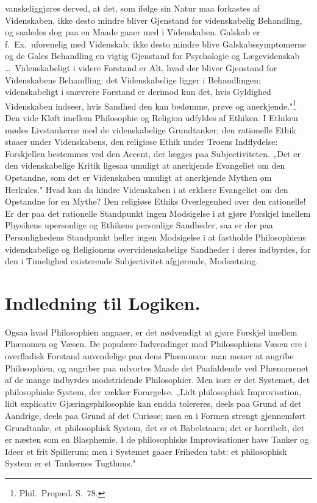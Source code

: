 \documentclass[12pt]{book}
\begin{document}
vanskeliggjøres derved, at det, som ifølge sin Natur maa forkastes af Videnskaben,
ikke desto mindre bliver Gjenstand for videnskabelig Behandling, og saaledes dog
paa en Maade gaaer med i Videnskaben. Galskab er f.\ Ex.\ uforenelig med Videnskab;
ikke desto mindre blive Galskabssymptomerne og de Gales Behandling en vigtig
Gjenstand for Psychologie og Lægevidenskab \dots\ Videnskabeligt i videre Forstand
er Alt, hvad der bliver Gjenstand for Videnskabens Behandling: det Videnskabelige
ligger i Behandlingen; videnskabeligt i snævrere Forstand er derimod kun det, hvis
Gyldighed Videnskaben indseer, hvis Sandhed den kan bedømme, prøve og
anerkjende."\footnote{Phil.\ Propæd. S.~78.}
Den vide Kløft imellem Philosophie og Religion udfyldes af Ethiken. I Ethiken
mødes Livstankerne med de videnskabelige Grundtanker; den rationelle Ethik staaer
under Videnskabens, den religiøse Ethik under Troens Indflydelse: Forskjellen
bestemmes ved den Accent, der lægges paa Subjectiviteten. „Det er den
videnskabelige Kritik ligesaa umuligt at anerkjende Evangeliet om den Opstandne,
som det er Videnskaben umuligt at anerkjende Mythen om Herkules." Hvad kan da
hindre Videnskaben i at erklære Evangeliet om den Opstandne for en Mythe? Den
religiøse Ethiks Overlegenhed over den rationelle! Er der paa det rationelle
Standpunkt ingen Modsigelse i at gjøre Forskjel imellem Physikens upersonlige og
Ethikens personlige Sandheder, saa er der paa Personlighedens Standpunkt heller
ingen Modsigelse i at fastholde Philosophiens videnskabelige og Religionens
overvidenskabelige Sandheder i deres indbyrdes, for den i Timelighed existerende
Subjectivitet afgjørende, Modsætning.

\section*{Indledning til Logiken.}

Ogsaa hvad Philosophien angaaer, er det nødvendigt at gjøre Forskjel imellem
Phænomen og Væsen. De populære Indvendinger mod Philosophiens Væsen ere i
overfladisk Forstand anvendelige paa dens Phænomen: man mener at angribe
Philosophien, og angriber paa udvortes Maade det Paafaldende ved Phænomenet af de
mange indbyrdes modstridende Philosophier. Men især er det Systemet, det
philosophiske System, der vækker Forargelse. „Lidt philosophisk Improvisation,
lidt explicativ Gjæringsphilosophie kan endda tolereres, deels paa Grund af det
Aandrige, deels paa Grund af det Curiøse; men en i Formen strengt gjennemført
Grundtanke, et philosophisk System, det er et Babelstaarn; det er horribelt, det
er næsten som en Blasphemie. I de philosophiske Improvisationer have Tanker
og Ideer et frit Spillerum; men i Systemet gaaer Friheden tabt: et philosophisk
System er et Tankernes Tugthuus."
\end{document}
